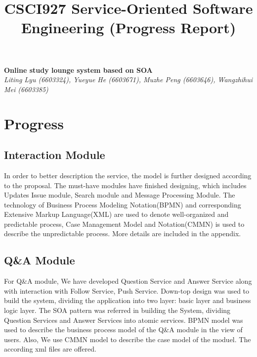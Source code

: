 \documentclass[runningheads]{llncs}
\begin{document}
\title{\large{CSCI927 Service-Oriented Software Engineering (Progress Report)}}
\author{}
\institute{}
\maketitle
\vspace{-1cm}



\begin{center}
\Large{\textbf{Online study lounge system based on SOA}} \\ %
\vspace{0.2cm}
\large{\emph{ Liting Lyu (6603324), Yueyue  He (6603671), Muzhe Peng (6603646), Wangzhihui Mei (6603385)}}\\%
\vspace{0.3cm}
\end{center}

\noindent %
\section{Progress}
\subsection{Interaction Module}
In order to better description the service, the model is further designed according to the proposal. The must-have modules have finished designing, which includes Updates Issue module, Search module and Message Processing Module. The technology of Business Process Modeling Notation(BPMN) and corresponding Extensive Markup Language(XML) are used to denote well-organized and predictable process, Case Management Model and Notation(CMMN) is used to describe the unpredictable process. More details are included in the appendix. 




\subsection{Q\&A Module} %
For Q\&A module, We have developed Question Service and Answer Service along with interaction with Follow Service, Push Service. Down-top design was used to build the system, dividing the application into two layer: basic layer and business logic layer. The SOA pattern was referred in building the System, dividing Question Services and Answer Services into atomic services. BPMN model was used to describe the business process model of the Q\&A module in the view of users. Also, We use CMMN model to describe the case model of the moduel. The according xml files are offered.
\end{document}
